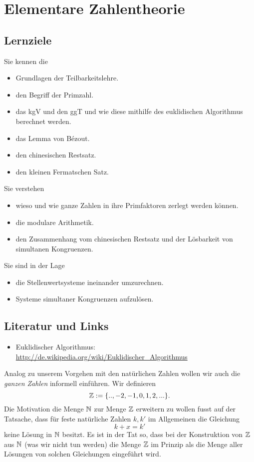 
\chapter{Elementare Zahlentheorie}




\section*{Lernziele}
Sie kennen die
\begin{itemize}
\item Grundlagen der Teilbarkeitslehre.
\item den Begriff der Primzahl.
\item das kgV und den ggT und wie diese mithilfe des  euklidischen Algorithmus berechnet werden.
\item das Lemma von Bézout.
\item den chinesischen Restsatz.
\item den kleinen Fermatschen Satz.
\end{itemize}
Sie verstehen
\begin{itemize}
\item wieso und wie ganze Zahlen in ihre Primfaktoren zerlegt werden können.
\item die modulare Arithmetik.
\item den Zusammenhang vom chinesischen Restsatz und der Lösbarkeit von simultanen Kongruenzen.
\end{itemize}
Sie sind in der Lage
\begin{itemize}
\item die Stellenwertsysteme ineinander umzurechnen.
\item Systeme simultaner Kongruenzen aufzulösen.
\end{itemize}


\section*{Literatur und Links}
\begin{itemize}
\item Euklidischer Algorithmus:\\
\url{http://de.wikipedia.org/wiki/Euklidischer_Algorithmus}\\
\end{itemize}


Analog zu unserem Vorgehen mit den natürlichen Zahlen wollen wir auch die \textit{ganzen Zahlen} informell einführen. Wir definieren
\[
\mathbb{Z}:= \{..,-2,-1,0,1,2,...\}.
\]
Die Motivation die Menge $\mathbb{N}$ zur Menge $\mathbb{Z}$ erweitern zu wollen fusst auf der Tatsache, dass für feste natürliche Zahlen $k,k'$ im Allgemeinen die Gleichung
\[
 k+x=k'
\]
keine Lösung in $\mathbb{N}$ besitzt. Es ist in der Tat so, dass bei der Konstruktion von $\mathbb{Z}$ aus $\mathbb{N}$ (was wir nicht tun werden) die Menge $\mathbb{Z}$ im Prinzip als die Menge aller Lösungen von solchen Gleichungen eingeführt wird.

